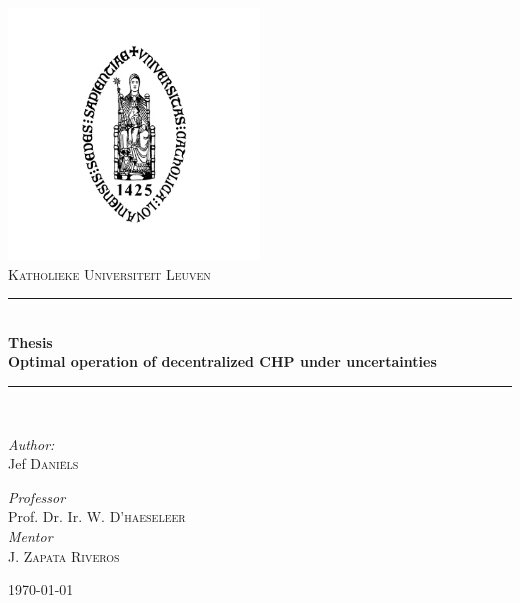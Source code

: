 \documentclass[pdftex12pt, a4paper]{book}
\newcommand{\HRule}{\rule{\linewidth}{0.5mm}}
\begin{document}

\renewcommand{\thepage}{\roman{page}}

\setlength\parindent{0pt}

\begin{titlepage}
\begin{center}

\includegraphics[width=0.5\textwidth]{Images/Sedes}\\[0.1cm]    

\textsc{\LARGE Katholieke Universiteit Leuven}\\[1.5cm]

\HRule \\[0.4cm]
{ \huge \bfseries Thesis \\ \vspace{2mm}Optimal operation of decentralized CHP under uncertainties }\\[0.4cm]

\HRule \\[1.5cm]

\begin{minipage}{0.4\textwidth}
\begin{flushleft} \large
\emph{Author:}\\
Jef \textsc{Dani\"els}\\
\vspace{40mm}
\end{flushleft}
\end{minipage}
\begin{minipage}{0.4\textwidth}
\begin{flushright} \large
\emph{Professor} \\
Prof. Dr. Ir. W. \textsc{D'haeseleer}\\
\emph{Mentor} \\
J. \textsc{Zapata Riveros }\\
\vspace{30mm}
\end{flushright}
\end{minipage}

\vfill

{\large \today}

\end{center}

\end{titlepage}
\end{document}
